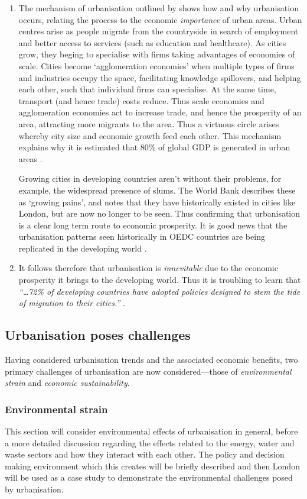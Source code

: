 \begin{enumerate}
	\item The mechanism of urbanisation outlined by \citet{WorldBank2008a} shows how and why urbanisation occurs, relating the process to the economic \emph{importance} of urban areas. Urban centres arise as people migrate from the countryside in search of employment and better access to services (such as education and healthcare). As cities grow, they beging to specialise with firms taking advantages of economies of scale. Cities become `agglomeration economies' when multiple types of firms and industries occupy the space, facilitating knowledge spillovers, and helping each other, such that individual firms can specialise. At the same time, transport (and hence trade) costs reduce. Thus scale economies and agglomeration economies act to increase trade, and hence the prosperity of an area, attracting more migrants to the area. Thus a virtuous circle arises whereby city size and economic growth feed each other. This mechanism explains why it is estimated that 80\% of global GDP is generated in urban areas \citep{AREAS2012}.

Growing cities in developing countries aren't without their problems, for example, the widespread presence of slums. The World Bank describes these as `growing pains', and notes that they have historically existed in cities like London, but are now no longer to be seen. Thus confirming that urbanisation is a clear long term route to economic prosperity. It is good news that the urbanisation patterns seen historically in OEDC countries are being replicated in the developing world \citep{WorldBank2008a}. 

	\item It follows therefore that urbanisation is \emph{innevitable} due to the economic prosperity it brings to the developing world. Thus it is troubling to learn that \emph{``\ldots 72\% of developing countries have adopted policies designed to stem the tide of migration to their cities.''} \citep{Donald2012}.
\end{enumerate}

\subsection{Urbanisation poses challenges}
Having considered urbanisation trends and the associated economic benefits, two primary challenges of urbanisation are now considered---those of \emph{environmental strain} and \emph{economic sustainability}.

\subsubsection*{Environmental strain}
This section will consider environmental effects of urbanisation in general, before a more detailed discussion regarding the effects related to the energy, water and waste sectors and how they interact with each other. The policy and decision making environment which this creates will be briefly described and then London will be used as a case study to demonstrate the environmental challenges posed by urbanisation.

